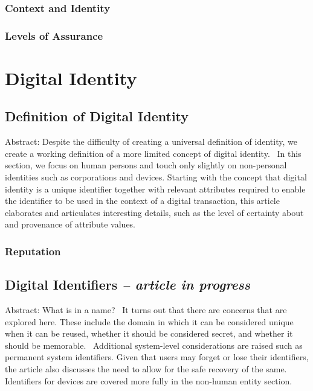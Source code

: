 \hypertarget{context-and-identity}{%
\subsection{Context and Identity}\label{context-and-identity}}

\hypertarget{levels-of-assurance}{%
\subsection{Levels of Assurance}\label{levels-of-assurance}}

\hypertarget{digital-identity}{%
\chapter{Digital Identity}\label{digital-identity}}

\hypertarget{definition-of-digital-identity}{%
\section{Definition of Digital
Identity}\label{definition-of-digital-identity}}

Abstract: Despite the difficulty of creating a universal definition of
identity, we create a working definition of a more limited concept of
digital identity.~ In this section, we focus on human persons and touch
only slightly on non-personal identities such as corporations and
devices. Starting with the concept that digital identity is a unique
identifier together with relevant attributes required to enable the
identifier to be used in the context of a digital transaction, this
article elaborates and articulates interesting details, such as the
level of certainty about and provenance of attribute values.

\hypertarget{reputation}{%
\subsection{Reputation}\label{reputation}}

\hypertarget{digital-identifiers-article-in-progress}{%
\section{\texorpdfstring{Digital Identifiers \emph{-- article in
progress}}{Digital Identifiers -- article in progress}}\label{digital-identifiers-article-in-progress}}

Abstract: What is in a name?~ It turns out that there are concerns that
are explored here. These include the domain in which it can be
considered unique when it can be reused, whether it should be considered
secret, and whether it should be memorable.~ Additional system-level
considerations are raised such as permanent system identifiers. Given
that users may forget or lose their identifiers, the article also
discusses the need to allow for the safe recovery of the same.
Identifiers for devices are covered more fully in the non-human entity
section.

